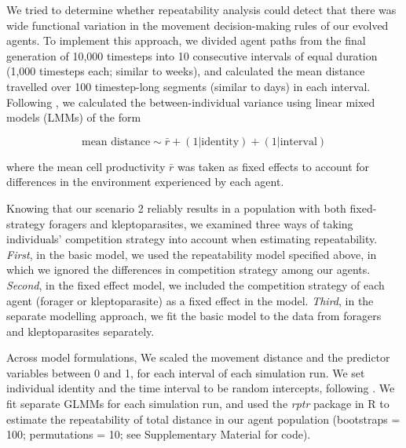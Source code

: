     We tried to determine whether repeatability analysis could detect that there was wide functional variation in the movement decision-making rules of our evolved agents.
    To implement this approach, we divided agent paths from the final generation of 10,000 timesteps into 10 consecutive intervals of equal duration (1,000 timesteps each; similar to weeks), and calculated the mean distance travelled over 100 timestep-long segments (similar to days) in each interval.
    Following \cite{hertel2019}, we calculated the between-individual variance using linear mixed models (LMMs) of the form
    \begin{linenomath*}
        \begin{equation}
            \text{mean distance} \sim \bar{r} + (1 | \text{identity}) + (1 | \text{interval})
        \end{equation}
    \end{linenomath*}
    where the mean cell productivity $\bar{r}$ was taken as fixed effects to account for differences in the environment experienced by each agent.
    
    Knowing that our scenario 2 reliably results in a population with both fixed-strategy foragers and kleptoparasites, we examined three ways of taking individuals' competition strategy into account when estimating repeatability.
    \textit{First}, in the basic model, we used the repeatability model specified above, in which we ignored the differences in competition strategy among our agents.
    \textit{Second}, in the fixed effect model, we included the competition strategy of each agent (forager or kleptoparasite) as a fixed effect in the model.
    \textit{Third}, in the separate modelling approach, we fit the basic model to the data from foragers and kleptoparasites separately.
    
    Across model formulations, We scaled the movement distance and the predictor variables between 0 and 1, for each interval of each simulation run.
    We set individual identity and the time interval to be random intercepts, following \citep{hertel2020}.
    We fit separate GLMMs for each simulation run, and used the \textit{rptr} package in R \citep{nakagawa2010} to estimate the repeatability of total distance in our agent population (bootstraps = 100; permutations = 10; see Supplementary Material for code).
    
